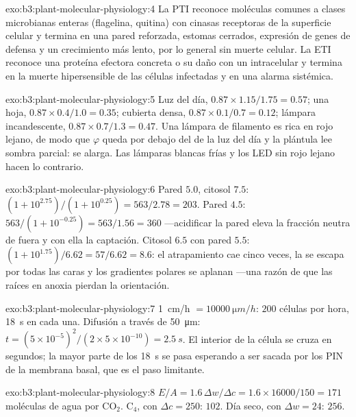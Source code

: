 \begin{solution}{exo:b3:plant-molecular-physiology:4}
La PTI reconoce moléculas comunes a clases microbianas enteras
(flagelina, quitina) con cinasas receptoras de la superficie celular y
termina en una pared reforzada, estomas cerrados, expresión de genes de
defensa y un crecimiento más lento, por lo general sin muerte celular.
La ETI reconoce una proteína efectora concreta o su daño con un
 intracelular y termina en la muerte hipersensible de las
células infectadas y en una alarma sistémica.
\end{solution}

\begin{solution}{exo:b3:plant-molecular-physiology:5}
Luz del día, $0.87\times 1.15/1.75 = 0.57$; una hoja, $0.87\times 0.4/1.0 =
0.35$; cubierta densa, $0.87\times 0.1/0.7 = 0.12$; lámpara
incandescente, $0.87\times 0.7/1.3 = 0.47$. Una lámpara de filamento es
rica en rojo lejano, de modo que $\varphi$ queda por debajo del de la
luz del día y la plántula lee sombra parcial: se alarga. Las lámparas
blancas frías y los LED sin rojo lejano hacen lo contrario.
\end{solution}

\begin{solution}{exo:b3:plant-molecular-physiology:6}
Pared $5.0$, citosol $7.5$: $(1 + 10^{2.75})/(1 + 10^{0.25}) = 563/2.78
= 203$. Pared $4.5$: $563/(1 + 10^{-0.25}) = 563/1.56 = 360$
---acidificar la pared eleva la fracción neutra de fuera y con ella la
captación. Citosol $6.5$ con pared $5.5$:
$(1 + 10^{1.75})/6.62 = 57/6.62 = 8.6$: el atrapamiento cae cinco
veces, la  se escapa por todas las caras y los gradientes
polares se aplanan ---una razón de que las raíces en anoxia pierdan la
orientación.
\end{solution}

\begin{solution}{exo:b3:plant-molecular-physiology:7}
\qty{1}{cm/h} $= \qty{10000}{\micro m/h}$: $200$ células por hora,
\qty{18}{s} en cada una. Difusión a través de \qty{50}{\micro m}: $t =
(5\times 10^{-5})^{2}/(2\times 5\times 10^{-10}) = \qty{2.5}{s}$. El
interior de la célula se cruza en segundos; la mayor parte de los
\qty{18}{s} se pasa esperando a ser sacada por los PIN de la membrana
basal, que es el paso limitante.
\end{solution}

\begin{solution}{exo:b3:plant-molecular-physiology:8}
$E/A = 1.6\,\Delta w/\Delta c = 1.6\times\num{16000}/150 = 171$
moléculas de agua por CO$_{2}$. C$_{4}$, con $\Delta c = 250$: $102$.
Día seco, con $\Delta w = 24$: $256$.
\end{solution}

